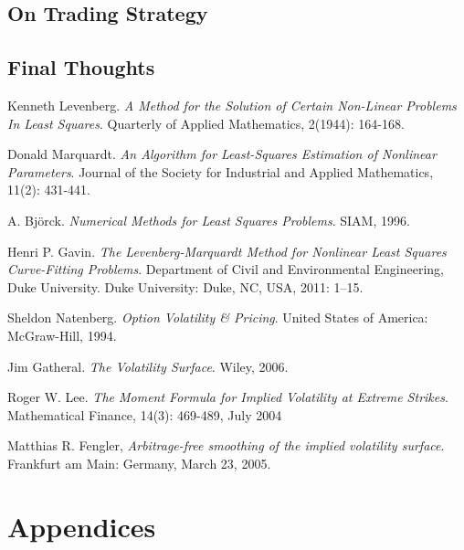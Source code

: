 \documentclass[12pt, a4paper, notitlepage]{article}
\numberwithin{equation}{subsection}
\numberwithin{figure}{subsection}
\numberwithin{table}{subsection}
\begin{document}
\subsection{On Trading Strategy}

\subsection{Final Thoughts}

\begin{thebibliography}{3}
	
    	Kenneth Levenberg.
        \textit{A Method for the Solution of Certain Non-Linear Problems In Least Squares}.
        Quarterly of Applied Mathematics, 2(1944): 164-168.
    
    	Donald Marquardt.
        \textit{An Algorithm for Least-Squares Estimation of Nonlinear Parameters}.  Journal of the Society for Industrial and Applied Mathematics, 11(2): 431-441.
    
        A. Bj\"orck.  \textit{Numerical Methods for Least Squares Problems}.
        SIAM, 1996.
        
        Henri P. Gavin.
        \textit{The Levenberg-Marquardt Method for Nonlinear Least Squares Curve-Fitting Problems}.
        Department of Civil and Environmental Engineering, Duke University.
        Duke University: Duke, NC, USA, 2011: 1–15.
    
    	Sheldon Natenberg.
        \textit{Option Volatility \& Pricing}.
        United States of America:  McGraw-Hill, 1994.
    
    	Jim Gatheral.
        \textit{The Volatility Surface}.
        Wiley, 2006.
    
    	Roger W. Lee.
        \textit{The Moment Formula for Implied Volatility at Extreme Strikes}.
        Mathematical Finance, 14(3): 469-489, July 2004
    
	  Matthias R. Fengler,
	  \textit{Arbitrage-free smoothing of the implied volatility surface}.
	  Frankfurt am Main: Germany,
	  March 23, 2005.
	  

\end{thebibliography}

\newpage
\section{Appendices} \label{Appendicies}
\end{document}
